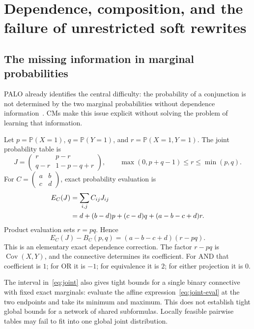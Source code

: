 \documentclass[11pt,a4paper]{article}
\theoremstyle{remark}
\newcommand{\Prob}{\mathbb P}
\newcommand{\Cov}{\operatorname{Cov}}
\begin{document}
\section{Dependence, composition, and the failure of unrestricted soft rewrites}
\subsection{The missing information in marginal probabilities}
PALO already identifies the central difficulty: the probability of a conjunction is not determined by the two marginal probabilities without dependence information~\cite[pp.~5--6, 17, 23--25]{palo}. CMs make this issue explicit without solving the problem of learning that information.

Let $p=\Prob(X=1)$, $q=\Prob(Y=1)$, and $r=\Prob(X=1,Y=1)$. The joint probability table is
\begin{equation}
 J=\begin{pmatrix}r&p-r\\q-r&1-p-q+r\end{pmatrix},
 \qquad \max(0,p+q-1)\le r\le\min(p,q).
 \label{eq:joint}
\end{equation}
For $C=\left(\begin{smallmatrix}a&b\\c&d\end{smallmatrix}\right)$, exact probability evaluation is
\begin{align}
 E_C(J)&=\sum_{i,j} C_{ij}J_{ij}\notag\\
 &=d+(b-d)p+(c-d)q+(a-b-c+d)r.\label{eq:joint-eval}
\end{align}
Product evaluation sets $r=pq$. Hence
\begin{equation}
 E_C(J)-B_C(p,q)=(a-b-c+d)(r-pq).
 \label{eq:covariance}
\end{equation}
This is an elementary exact dependence correction. The factor $r-pq$ is $\Cov(X,Y)$, and the connective determines its coefficient. For AND that coefficient is $1$; for OR it is $-1$; for equivalence it is $2$; for either projection it is $0$.

The interval in~\eqref{eq:joint} also gives tight bounds for a single binary connective with fixed exact marginals: evaluate the affine expression~\eqref{eq:joint-eval} at the two endpoints and take its minimum and maximum. This does not establish tight global bounds for a network of shared subformulas. Locally feasible pairwise tables may fail to fit into one global joint distribution.
\end{document}
